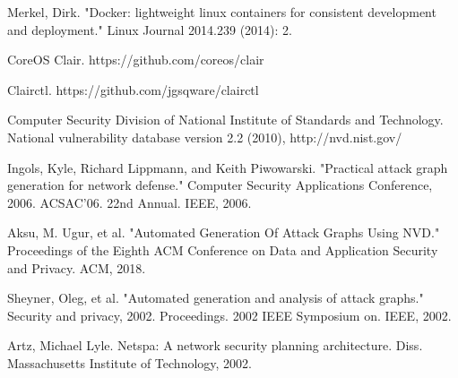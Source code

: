 \documentclass[letterpaper, 10 pt, conference]{ieeeconf}  %
\begin{document}
\begin{thebibliography}{99}

 Merkel, Dirk. "Docker: lightweight linux containers for consistent development and deployment." Linux Journal 2014.239 (2014): 2.

  CoreOS Clair. https://github.com/coreos/clair

  Clairctl. https://github.com/jgsqware/clairctl

  Computer Security Division of National Institute of Standards and Technology.
National vulnerability database version 2.2 (2010),
http://nvd.nist.gov/

  Ingols, Kyle, Richard Lippmann, and Keith Piwowarski. "Practical attack graph generation for network defense." Computer Security Applications Conference, 2006. ACSAC'06. 22nd Annual. IEEE, 2006.

  Aksu, M. Ugur, et al. "Automated Generation Of Attack Graphs Using NVD." Proceedings of the Eighth ACM Conference on Data and Application Security and Privacy. ACM, 2018.

  Sheyner, Oleg, et al. "Automated generation and analysis of attack graphs." Security and privacy, 2002. Proceedings. 2002 IEEE Symposium on. IEEE, 2002.

  Artz, Michael Lyle. Netspa: A network security planning architecture. Diss. Massachusetts Institute of Technology, 2002.
\end{thebibliography}
\end{document}
